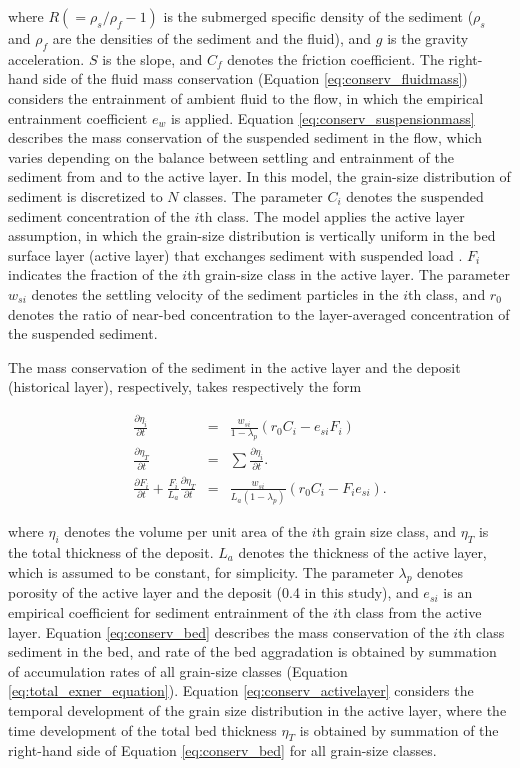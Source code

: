 \noindent where $R(=\rho_s/\rho_f - 1)$ is the submerged specific density of the sediment ($\rho_s$ and $\rho_f$ are the densities of the sediment and the fluid), and $g$ is the gravity acceleration. $S$ is the slope, and $C_f$ denotes the friction coefficient. The right-hand side of the fluid mass conservation (Equation \ref{eq:conserv_fluidmass}) considers the entrainment of ambient fluid to the flow, in which the empirical entrainment coefficient $e_w$ is applied. Equation \ref{eq:conserv_suspensionmass} describes the mass conservation of the suspended sediment in the flow, which varies depending on the balance between settling and entrainment of the sediment from and to the active layer. In this model, the grain-size distribution of sediment is discretized to $N$ classes. The parameter $C_i$ denotes the suspended sediment concentration of the $i$th class. The model applies the active layer assumption, in which the grain-size distribution is vertically uniform in the bed surface layer (active layer) that exchanges sediment with suspended load \citep{Hirano1971}. $F_i$ indicates the fraction of the $i$th grain-size class in the active layer. The parameter $w_{si}$ denotes the settling velocity of the sediment particles in the $i$th class, and $r_0$ denotes the ratio of near-bed concentration to the layer-averaged concentration of the suspended sediment.

The mass conservation of the sediment in the active layer and the deposit (historical layer), respectively, takes respectively the form

\begin{eqnarray}
  \frac{\partial \eta_i}{\partial t} & = & \frac{w_{si}}{1-\lambda_p}(r_0 C_i - e_{si} F_i) \label{eq:conserv_bed} \\
\frac{\partial \eta_T}{\partial t} &=& \sum \frac{\partial \eta_i}{\partial t}.
\label{eq:total_exner_equation} \\
\frac{\partial F_i}{\partial t} + \frac{F_i}{L_a}\frac{\partial \eta_T}{\partial t} & = & \frac{w_{si}}{L_a (1 - \lambda_p)}(r_0 C_i - F_i e_{si} ). \label{eq:conserv_activelayer}
\end{eqnarray}

\noindent where $\eta_i$ denotes the volume per unit area of the $i$th grain size class, and $\eta_T$ is the total thickness of the deposit. $L_a$ denotes the thickness of the active layer, which is assumed to be constant, for simplicity. The parameter $\lambda_p$ denotes porosity of the active layer and the deposit (0.4 in this study), and $e_{si}$ is an empirical coefficient for sediment entrainment of the $i$th class from the active layer. Equation \ref{eq:conserv_bed} describes the mass conservation of the $i$th class sediment in the bed, and rate of the bed aggradation is obtained by summation of accumulation rates of all grain-size classes (Equation \ref{eq:total_exner_equation}). Equation \ref{eq:conserv_activelayer} considers the temporal development of the grain size distribution in the active layer, where the time development of the total bed thickness $\eta_T$ is obtained by summation of the right-hand side of Equation \ref{eq:conserv_bed} for all grain-size classes.

